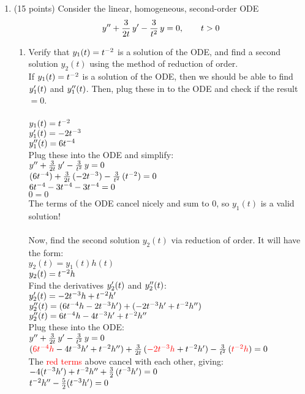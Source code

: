 \documentclass{article}
\begin{document}
\begin{enumerate}

\bigskip
\item (15 points) Consider the linear, homogeneous, second-order ODE
\[
y\sp{\prime\prime}+{3\over2t}\,y\sp\prime-{3\over t\sp2}\,y=0,\qquad t>0
\]
\begin{enumerate}
\item
Verify that $y_1(t)=t\sp{-2}$ is a solution of the ODE, and find a second solution $y_2(t)$ using the method of reduction of order.\\

If $y_1(t)=t\sp{-2}$ is a solution of the ODE, then we should be able to find $y_1\sp{\prime}(t)$ and $y_1\sp{\prime\prime}(t)$. Then, plug these in to the ODE and check if the result$=0$.\\\\
$y_1(t)=t\sp{-2}$\\
$y_1\sp{\prime}(t)=-2t\sp{-3}$\\
$y_1\sp{\prime\prime}(t)=6t\sp{-4}$\\
Plug these into the ODE and simplify:\\
$y\sp{\prime\prime}+{3\over2t}\,y\sp\prime-{3\over t\sp2}\,y=0$\\
$(6t\sp{-4})+{3\over2t}\,(-2t\sp{-3})-{3\over t\sp2}\,(t\sp{-2})=0$\\
$6t\sp{-4}-3t\sp{-4}-3t\sp{-4}=0$\\
$0=0$\\
The terms of the ODE cancel nicely and sum to 0, so $y_1(t)$ is a valid solution!\\\\
Now, find the second solution $y_2(t)$ via reduction of order. It will have the form:\\
$y_2(t)=y_1(t)h(t)$\\
$y_2(t)=t\sp{-2}h$\\
Find the derivatives $y_2\sp\prime(t)$ and $y_2\sp{\prime\prime}(t)$:\\
$y_2\sp\prime(t)=-2t\sp{-3}h + t\sp{-2}h\sp\prime$\\

$y_2\sp{\prime\prime}(t)=(6t\sp{-4}h - 2t\sp{-3}h\sp\prime) + (-2t\sp{-3}h\sp\prime + t\sp{-2}h\sp{\prime\prime})$\\
$y_2\sp{\prime\prime}(t)=6t\sp{-4}h - 4t\sp{-3}h\sp\prime + t\sp{-2}h\sp{\prime\prime}$\\

Plug these into the ODE:\\
$y\sp{\prime\prime}+{3\over2t}\,y\sp\prime-{3\over t\sp2}\,y=0$\\
$(\textcolor{red}{6t\sp{-4}h} - 4t\sp{-3}h\sp\prime + t\sp{-2}h\sp{\prime\prime})+{3\over2t}\,(\textcolor{red}{-2t\sp{-3}h} + t\sp{-2}h\sp\prime)-{3\over t\sp2}\,(\textcolor{red}{t\sp{-2}h})=0$\\
The \textcolor{red}{red terms} above cancel with each other, giving:\\
$ - 4(t\sp{-3}h\sp\prime) + t\sp{-2}h\sp{\prime\prime}+{3\over2}\,( t\sp{-3}h\sp\prime)=0$\\
$ t\sp{-2}h\sp{\prime\prime} - {5\over2}(t\sp{-3}h\sp\prime) =0$\\


\end{enumerate}
\end{enumerate}
\end{document}
